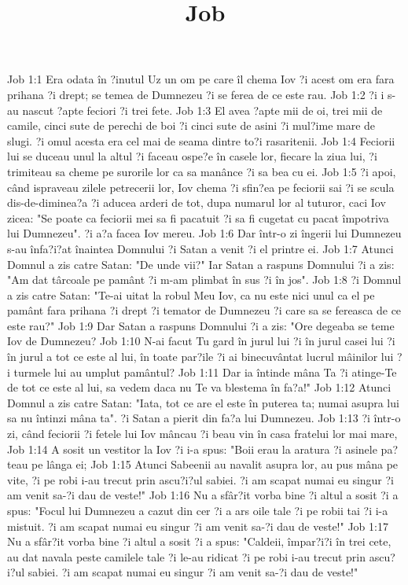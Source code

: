 

\title{Job}

Job 1:1  Era odata în ?inutul Uz un om pe care îl chema Iov ?i acest om era fara prihana ?i drept; se temea de Dumnezeu ?i se ferea de ce este rau.
Job 1:2  ?i i s-au nascut ?apte feciori ?i trei fete.
Job 1:3  El avea ?apte mii de oi, trei mii de camile, cinci sute de perechi de boi ?i cinci sute de asini ?i mul?ime mare de slugi. ?i omul acesta era cel mai de seama dintre to?i rasaritenii.
Job 1:4  Feciorii lui se duceau unul la altul ?i faceau ospe?e în casele lor, fiecare la ziua lui, ?i trimiteau sa cheme pe surorile lor ca sa manânce ?i sa bea cu ei.
Job 1:5  ?i apoi, când ispraveau zilele petrecerii lor, Iov chema ?i sfin?ea pe feciorii sai ?i se scula dis-de-diminea?a ?i aducea arderi de tot, dupa numarul lor al tuturor, caci Iov zicea: "Se poate ca feciorii mei sa fi pacatuit ?i sa fi cugetat cu pacat împotriva lui Dumnezeu". ?i a?a facea Iov mereu.
Job 1:6  Dar într-o zi îngerii lui Dumnezeu s-au înfa?i?at înaintea Domnului ?i Satan a venit ?i el printre ei.
Job 1:7  Atunci Domnul a zis catre Satan: "De unde vii?" Iar Satan a raspuns Domnului ?i a zis: "Am dat târcoale pe pamânt ?i m-am plimbat în sus ?i în jos".
Job 1:8  ?i Domnul a zis catre Satan: "Te-ai uitat la robul Meu Iov, ca nu este nici unul ca el pe pamânt fara prihana ?i drept ?i temator de Dumnezeu ?i care sa se fereasca de ce este rau?"
Job 1:9  Dar Satan a raspuns Domnului ?i a zis: "Ore degeaba se teme Iov de Dumnezeu?
Job 1:10  N-ai facut Tu gard în jurul lui ?i în jurul casei lui ?i în jurul a tot ce este al lui, în toate par?ile ?i ai binecuvântat lucrul mâinilor lui ?i turmele lui au umplut pamântul?
Job 1:11  Dar ia întinde mâna Ta ?i atinge-Te de tot ce este al lui, sa vedem daca nu Te va blestema în fa?a!"
Job 1:12  Atunci Domnul a zis catre Satan: "Iata, tot ce are el este în puterea ta; numai asupra lui sa nu întinzi mâna ta". ?i Satan a pierit din fa?a lui Dumnezeu.
Job 1:13  ?i într-o zi, când feciorii ?i fetele lui Iov mâncau ?i beau vin în casa fratelui lor mai mare,
Job 1:14  A sosit un vestitor la Iov ?i i-a spus: "Boii erau la aratura ?i asinele pa?teau pe lânga ei;
Job 1:15  Atunci Sabeenii au navalit asupra lor, au pus mâna pe vite, ?i pe robi i-au trecut prin ascu?i?ul sabiei. ?i am scapat numai eu singur ?i am venit sa-?i dau de veste!"
Job 1:16  Nu a sfâr?it vorba bine ?i altul a sosit ?i a spus: "Focul lui Dumnezeu a cazut din cer ?i a ars oile tale ?i pe robii tai ?i i-a mistuit. ?i am scapat numai eu singur ?i am venit sa-?i dau de veste!"
Job 1:17  Nu a sfâr?it vorba bine ?i altul a sosit ?i a spus: "Caldeii, împar?i?i în trei cete, au dat navala peste camilele tale ?i le-au ridicat ?i pe robi i-au trecut prin ascu?i?ul sabiei. ?i am scapat numai eu singur ?i am venit sa-?i dau de veste!"
